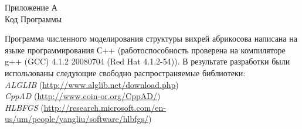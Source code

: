 \label{ch:A}
\begin{center}
    Приложение А\\
    Код Программы
\end{center}

Программа численного моделирования структуры вихрей абрикосова написана на 
языке программирования С++ (работоспособность проверена на компиляторе g++ 
(GCC) 4.1.2 20080704 (Red Hat 4.1.2-54)). В результате разработки были 
использованы следующие свободно распространяемые библиотеки: \\
\emph{ALGLIB} (\url{http://www.alglib.net/download.php}) \\
\emph{CppAD} (\url{http://www.coin-or.org/CppAD/}) \\
\emph{HLBFGS} 
(\url{http://research.microsoft.com/en-us/um/people/yangliu/software/hlbfgs/})

\newpage

